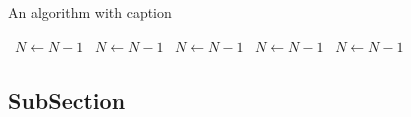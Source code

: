 \documentclass[a4paper]{article}
\begin{document}
\begin{algorithm}
\caption{An algorithm with caption}
\begin{algorithmic}
\    \State $N \gets N - 1$
\    \State $N \gets N - 1$
\    \State $N \gets N - 1$
\    \State $N \gets N - 1$
\    \State $N \gets N - 1$
\EndWhile
\end{algorithmic}
\end{algorithm}

\subsection{SubSection}
\end{document}

